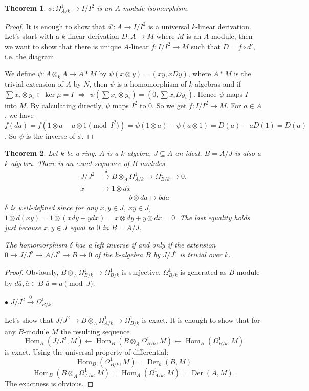 \documentclass[cs4size]{article}
\newcommand{\su}{\subseteq}
\newcommand{\la}{\leftarrow}
\newcommand{\ra}{\rightarrow}
\newcommand{\xr}{\xrightarrow}
\newcommand{\Ra}{\Rightarrow}
\DeclareMathOperator{\Der}{Der}
\DeclareMathOperator{\Hom}{Hom}
\newtheorem{thm}{Theorem}
\begin{document}
\begin{thm}
$\phi: \Omega_{A/k}^1\ra I/I^2$ is an $A$-module isomorphism.
\end{thm}
\begin{proof}
It is enough to show that $d': A\ra I/I^2$ is a universal $k$-linear derivation. Let's start with a $k$-linear derivation $D: A\ra M$ where $M$ is an $A$-module, then we want to show that there is unique $A$-linear $f:I/I^2\ra M$ such that $D=f\circ d'$, i.e. the diagram
\begin{center}
\end{center}
We define $\psi: A\otimes_kA\ra A\ast M$ by $\psi(x\otimes y)=(xy,xDy)$, where $A\ast M$ is the trivial extension of $A$ by $N$, then $\psi$ is a homomorphism of $k$-algebras and if $\sum x_i\otimes y_i\in\ker \mu=I$ $\Ra$ $\psi(\sum x_i\otimes y_i)=(0,\sum x_iDy_i)$. Hence $\psi$ maps $I$ into $M$. By calculating directly, $\psi$ maps $I^2$ to $0$. So we get $f: I/I^2\ra M$. For $a\in A$, we have $f(da)=f(1\otimes a-a\otimes 1\pmod{I^2})=\psi(1\otimes a)-\psi(a\otimes 1)=D(a)-aD(1)=D(a)$. So $\psi$ is the inverse of $\phi$.
\end{proof}

\begin{thm}
Let $k$ be a ring. $A$ is a $k$-algebra, $J\su A$ an ideal. $B=A/J$ is also a $k$-algebra. There is an exact sequence of $B$-modules
\begin{align*}
J/J^2&\xr{\delta}B\otimes_A\Omega_{A/k}^1\ra \Omega_{B/k}^1\ra 0.\\
x&\mapsto 1\otimes dx \\
& \qquad \qquad b\otimes da\mapsto bda
\end{align*}
$\delta$ is well-defined since for any $x,y\in J$, $xy\in J$, $1\otimes d(xy)=1\otimes (xdy+ydx)=x\otimes dy+y\otimes dx=0$. The last equality holds just because $x,y\in J$ equal to $0$ in $B=A/J$.

The homomorphism $\delta$ has a left inverse if and only if the extension $0\ra J/J^2\ra A/J^2\ra B\ra 0$ of the $k$-algebra $B$ by $J/J^2$ is trivial over $k$.
\end{thm}
\begin{proof}
Obviously, $B\otimes_A\Omega_{B/k}^1\ra \Omega_{B/k}^1$ is surjective. $\Omega_{B/k}^1$ is generated as $B$-module by $d\bar{a}, \bar{a}\in B$ $\bar{a}=a\pmod{J}$.

$\bullet$ $J/J^2\xr{0}\Omega_{B/k}^1$.

Let's show that $J/J^2\ra B\otimes_A\Omega_{A/k}^1\ra \Omega_{B/k}^1$ is exact. It is enough to show that for any $B$-module $M$ the resulting sequence
\[\Hom_B(J/J^2,M)\la\Hom_B(B\otimes_A\Omega_{B/k}^1,M)\la\Hom_B(\Omega_{B/k}^1,M)\]
is exact. Using the universal property of differential:
\[\Hom_B(\Omega_{B/k}^1,M)=\Der_k(B,M)\]
\[\Hom_B(B\otimes_A\Omega_{A/k}^1,M)=\Hom_A(\Omega_{A/k}^1,M)=\Der(A,M).\]
The exactness is obvious.
\end{proof}
\end{document}
